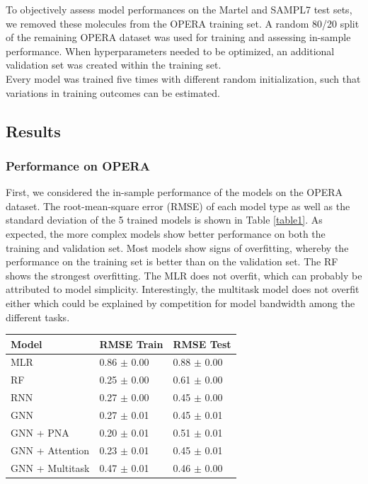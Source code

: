 \documentclass{article}
\begin{document}
To objectively assess model performances on the Martel and SAMPL7 test sets, we removed these molecules from the OPERA training set. A random 80/20 split of the remaining OPERA dataset was used for training and assessing in-sample performance. When hyperparameters needed to be optimized, an additional validation set was created within the training set. \\

Every model was trained five times with different random initialization, such that variations in training outcomes can be estimated.

\subsection{Results}

\subsubsection{Performance on OPERA}

First, we considered the in-sample performance of the models on the OPERA dataset. The root-mean-square error (RMSE) of each model type as well as the standard deviation of the 5 trained models is shown in Table \ref{table1}. As expected, the more complex models show better performance on both the training and validation set. Most models show signs of overfitting, whereby the performance on the training set is better than on the validation set. The RF shows the strongest overfitting. The MLR does not overfit, which can probably be attributed to model simplicity. Interestingly, the multitask model does not overfit either which could be explained by competition for model bandwidth among the different tasks.

\begin{center}
\begin{tabular}{ | m{3cm} | m{2.5cm}| m{2.5cm} | } 
  \hline
  \textbf{Model} & \textbf{RMSE Train} & \textbf{RMSE Test} \\ 
  \hline
  MLR & 0.86 $\pm$ 0.00 & 0.88 $\pm$ 0.00 \\ 
  \hline
  RF & 0.25 $\pm$ 0.00 & 0.61 $\pm$ 0.00 \\ 
  \hline
  RNN & 0.27 $\pm$ 0.00 & 0.45 $\pm$ 0.00 \\ 
  \hline
  GNN & 0.27 $\pm$ 0.01 & 0.45 $\pm$ 0.01 \\ 
  \hline
  GNN + PNA & 0.20 $\pm$ 0.01 & 0.51 $\pm$ 0.01 \\ 
  \hline
  GNN + Attention & 0.23 $\pm$ 0.01 & 0.45 $\pm$ 0.01 \\ 
  \hline
  GNN + Multitask & 0.47 $\pm$ 0.01 & 0.46 $\pm$ 0.00 \\ 
  \hline
\end{tabular}
\captionsetup{width=0.8\textwidth}
\label{table1}
\end{center}
\end{document}
